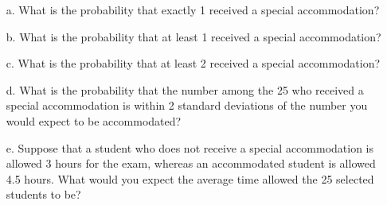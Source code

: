 \documentclass[letterpaper,12pt]{article}
\begin{document}
\begin{enumerate}
    \begin{enumerate}
      \item[a.]
        What is the probability that exactly 1 received a special accommodation?
      \item[b.]
        What is the probability that at least 1 received a special accommodation?
      \item[c.]
        What is the probability that at least 2 received a special accommodation?
      \item[d.]
        What is the probability that the number among the 25 who received a special accommodation is within 2 standard deviations of the number you would expect to be accommodated?
      \item[e.]
        Suppose that a student who does not receive a special accommodation is allowed 3 hours for the exam, whereas an accommodated student is allowed 4.5 hours. What would you expect the average time allowed the 25 selected students to be?
    \end{enumerate}
\end{enumerate}
\end{document}
